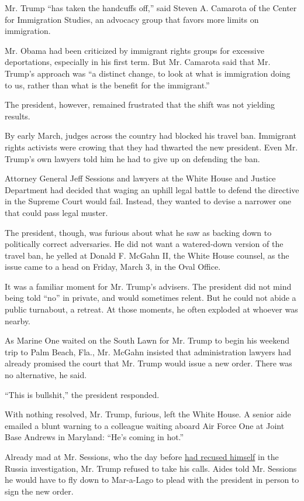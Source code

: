 Mr. Trump ``has taken the handcuffs off,'' said Steven A. Camarota of
the Center for Immigration Studies, an advocacy group that favors more
limits on immigration.

Mr. Obama had been criticized by immigrant rights groups for excessive
deportations, especially in his first term. But Mr. Camarota said that
Mr. Trump's approach was ``a distinct change, to look at what is
immigration doing to us, rather than what is the benefit for the
immigrant.''

The president, however, remained frustrated that the shift was not
yielding results.

By early March, judges across the country had blocked his travel ban.
Immigrant rights activists were crowing that they had thwarted the new
president. Even Mr. Trump's own lawyers told him he had to give up on
defending the ban.

Attorney General Jeff Sessions and lawyers at the White House and
Justice Department had decided that waging an uphill legal battle to
defend the directive in the Supreme Court would fail. Instead, they
wanted to devise a narrower one that could pass legal muster.

The president, though, was furious about what he saw as backing down to
politically correct adversaries. He did not want a watered-down version
of the travel ban, he yelled at Donald F. McGahn II, the White House
counsel, as the issue came to a head on Friday, March 3, in the Oval
Office.

It was a familiar moment for Mr. Trump's advisers. The president did not
mind being told ``no'' in private, and would sometimes relent. But he
could not abide a public turnabout, a retreat. At those moments, he
often exploded at whoever was nearby.

As Marine One waited on the South Lawn for Mr. Trump to begin his
weekend trip to Palm Beach, Fla., Mr. McGahn insisted that
administration lawyers had already promised the court that Mr. Trump
would issue a new order. There was no alternative, he said.

``This is bullshit,'' the president responded.

With nothing resolved, Mr. Trump, furious, left the White House. A
senior aide emailed a blunt warning to a colleague waiting aboard Air
Force One at Joint Base Andrews in Maryland: ``He's coming in hot.''

Already mad at Mr. Sessions, who the day before
\href{https://www.nytimes3xbfgragh.onion/2017/03/02/us/politics/jeff-sessions-russia-trump-investigation-democrats.html}{had
recused himself} in the Russia investigation, Mr. Trump refused to take
his calls. Aides told Mr. Sessions he would have to fly down to
Mar-a-Lago to plead with the president in person to sign the new order.

